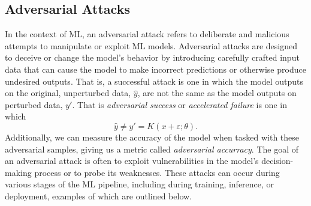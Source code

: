\documentclass[conference]{IEEEtran}
\begin{document}
\subsection{Adversarial Attacks}
\label{attacks}
In the context of ML, an adversarial attack refers to deliberate and malicious attempts to manipulate or exploit ML models. Adversarial attacks are designed to deceive or change the model's behavior by introducing carefully crafted input data that can cause the model to make incorrect predictions or otherwise produce undesired outputs. That is, a successful attack is one in which the model outputs on the original, unperturbed data, $\hat{y}$, are not the same as the model outputs on perturbed data, $y'$. That is \textit{adversarial success} or \textit{accelerated failure} is one in which
\begin{equation}
    \hat{y} \neq y' = K(x + \varepsilon; \theta).
\label{eq:adv_success}
\end{equation}
Additionally, we can measure the accuracy of the model when tasked with these adversarial samples, giving us a metric called \textit{adversarial accurracy}. The goal of an adversarial attack is often to exploit vulnerabilities in the model's decision-making process or to probe its weaknesses. These attacks can occur during various stages of the ML pipeline, including during training, inference, or deployment, examples of which are outlined below.
\end{document}
